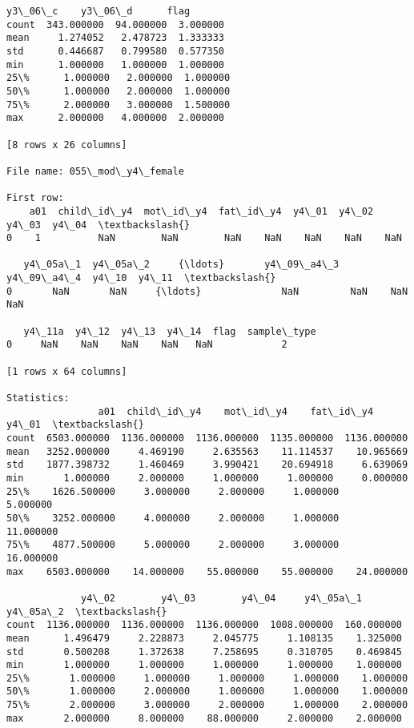 \documentclass[11pt]{article}
\begin{document}
\begin{Verbatim}[commandchars=\\\{\}]
          y3\_06\_c    y3\_06\_d      flag  
count  343.000000  94.000000  3.000000  
mean     1.274052   2.478723  1.333333  
std      0.446687   0.799580  0.577350  
min      1.000000   1.000000  1.000000  
25\%      1.000000   2.000000  1.000000  
50\%      1.000000   2.000000  1.000000  
75\%      2.000000   3.000000  1.500000  
max      2.000000   4.000000  2.000000  

[8 rows x 26 columns]

File name: 055\_mod\_y4\_female

First row: 
    a01  child\_id\_y4  mot\_id\_y4  fat\_id\_y4  y4\_01  y4\_02  y4\_03  y4\_04  \textbackslash{}
0    1          NaN        NaN        NaN    NaN    NaN    NaN    NaN   

   y4\_05a\_1  y4\_05a\_2     {\ldots}       y4\_09\_a4\_3  y4\_09\_a4\_4  y4\_10  y4\_11  \textbackslash{}
0       NaN       NaN     {\ldots}              NaN         NaN    NaN    NaN   

   y4\_11a  y4\_12  y4\_13  y4\_14  flag  sample\_type  
0     NaN    NaN    NaN    NaN   NaN            2  

[1 rows x 64 columns]

Statistics: 
                a01  child\_id\_y4    mot\_id\_y4    fat\_id\_y4        y4\_01  \textbackslash{}
count  6503.000000  1136.000000  1136.000000  1135.000000  1136.000000   
mean   3252.000000     4.469190     2.635563    11.114537    10.965669   
std    1877.398732     1.460469     3.990421    20.694918     6.639069   
min       1.000000     2.000000     1.000000     1.000000     0.000000   
25\%    1626.500000     3.000000     2.000000     1.000000     5.000000   
50\%    3252.000000     4.000000     2.000000     1.000000    11.000000   
75\%    4877.500000     5.000000     2.000000     3.000000    16.000000   
max    6503.000000    14.000000    55.000000    55.000000    24.000000   

             y4\_02        y4\_03        y4\_04     y4\_05a\_1    y4\_05a\_2  \textbackslash{}
count  1136.000000  1136.000000  1136.000000  1008.000000  160.000000   
mean      1.496479     2.228873     2.045775     1.108135    1.325000   
std       0.500208     1.372638     7.258695     0.310705    0.469845   
min       1.000000     1.000000     1.000000     1.000000    1.000000   
25\%       1.000000     1.000000     1.000000     1.000000    1.000000   
50\%       1.000000     2.000000     1.000000     1.000000    1.000000   
75\%       2.000000     3.000000     2.000000     1.000000    2.000000   
max       2.000000     8.000000    88.000000     2.000000    2.000000   


\end{Verbatim}
\end{document}
